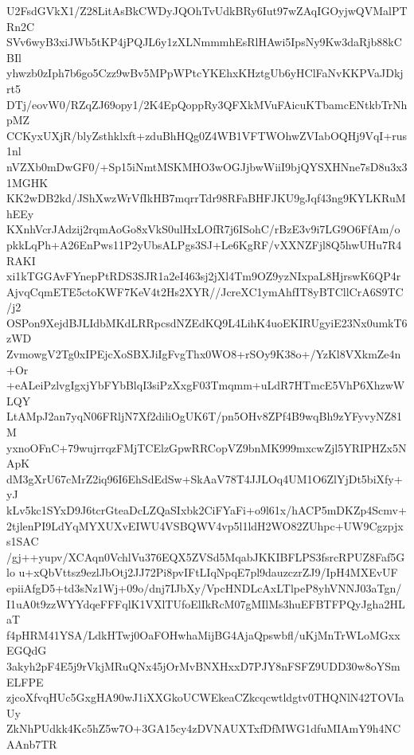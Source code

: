 U2FsdGVkX1/Z28LitAsBkCWDyJQOhTvUdkBRy6Iut97wZAqIGOyjwQVMalPTRn2C
SVv6wyB3xiJWb5tKP4jPQJL6y1zXLNmmmhEsRlHAwi5IpsNy9Kw3daRjb88kCBIl
yhwzb0zIph7b6go5Czz9wBv5MPpWPtcYKEhxKHztgUb6yHClFaNvKKPVaJDkjrt5
DTj/eovW0/RZqZJ69opy1/2K4EpQoppRy3QFXkMVuFAicuKTbamcENtkbTrNhpMZ
CCKyxUXjR/blyZsthklxft+zduBhHQg0Z4WB1VFTWOhwZVIabOQHj9VqI+rus1nl
nVZXb0mDwGF0/+Sp15iNmtMSKMHO3wOGJjbwWiiI9bjQYSXHNne7sD8u3x31MGHK
KK2wDB2kd/JShXwzWrVfIkHB7mqrrTdr98RFaBHFJKU9gJqf43ng9KYLKRuMhEEy
KXnhVcrJAdzij2rqmAoGo8xVkS0ulHxLOfR7j6ISohC/rBzE3v9i7LG9O6FfAm/o
pkkLqPh+A26EnPws11P2yUbsALPgs3SJ+Le6KgRF/vXXNZFjl8Q5hwUHu7R4RAKI
xi1kTGGAvFYnepPtRDS3SJR1a2eI463sj2jXl4Tm9OZ9yzNIxpaL8HjrswK6QP4r
AjvqCqmETE5ctoKWF7KeV4t2Hs2XYR//JcreXC1ymAhfIT8yBTCllCrA6S9TC/j2
OSPon9XejdBJLIdbMKdLRRpcsdNZEdKQ9L4LihK4uoEKIRUgyiE23Nx0umkT6zWD
ZvmowgV2Tg0xIPEjcXoSBXJiIgFvgThx0WO8+rSOy9K38o+/YzKl8VXkmZe4n+Or
+eALeiPzlvgIgxjYbFYbBlqI3siPzXxgF03Tmqmm+uLdR7HTmcE5VhP6XhzwWLQY
LtAMpJ2an7yqN06FRljN7Xf2diliOgUK6T/pn5OHv8ZPf4B9wqBh9zYFyvyNZ81M
yxnoOFnC+79wujrrqzFMjTCElzGpwRRCopVZ9bnMK999mxcwZjl5YRIPHZx5NApK
dM3gXrU67cMrZ2iq96I6EhSdEdSw+SkAaV78T4JJLOq4UM1O6ZlYjDt5biXfy+yJ
kLv5kc1SYxD9J6tcrGteaDcLZQaSIxbk2CiFYaFi+o9l61x/hACP5mDKZp4Scmv+
2tjlenPI9LdYqMYXUXvEIWU4VSBQWV4vp5l1ldH2WO82ZUhpc+UW9Cgzpjxs1SAC
/gj++yupv/XCAqn0VchlVu376EQX5ZVSd5MqabJKKIBFLPS3fsrcRPUZ8Faf5Glo
u+xQbVttsz9ezlJbOtj2JJ72Pi8pvIFtLIqNpqE7pl9dauzczrZJ9/IpH4MXEvUF
epiiAfgD5+td3sNz1Wj+09o/dnj7IJbXy/VpcHNDLcAxLTlpeP8yhVNNJ03aTgn/
I1uA0t9zzWYYdqeFFFqlK1VXlTUfoElIkRcM07gMIlMs3huEFBTFPQyJgha2HLaT
f4pHRM41YSA/LdkHTwj0OaFOHwhaMijBG4AjaQpswbfl/uKjMnTrWLoMGxxEGQdG
3akyh2pF4E5j9rVkjMRuQNx45jOrMvBNXHxxD7PJY8nFSFZ9UDD30w8oYSmELFPE
zjcoXfvqHUc5GxgHA90wJ1iXXGkoUCWEkeaCZkcqcwtldgtv0THQNlN42TOVIaUy
ZkNhPUdkk4Kc5hZ5w7O+3GA15cy4zDVNAUXTxfDfMWG1dfuMIAmY9h4NCAAnb7TR
